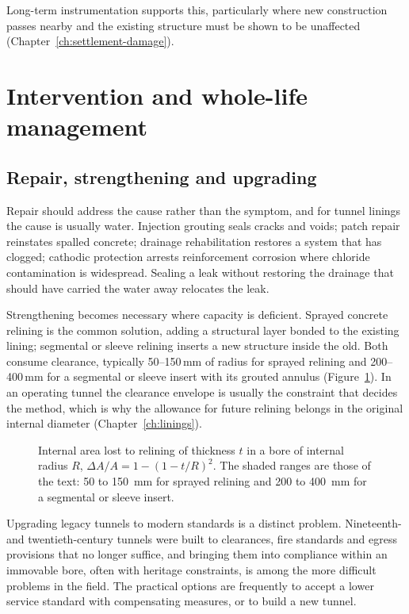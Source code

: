 Long-term instrumentation supports this, particularly where new construction
passes nearby and the existing structure must be shown to be unaffected
(Chapter~\ref{ch:settlement-damage}).

\section{Intervention and whole-life management}
\label{sec:intervention-whole-life}

\subsection{Repair, strengthening and upgrading}
\label{sec:repair-strengthening}

Repair should address the cause rather than the symptom, and for tunnel
linings the cause is usually water. Injection grouting seals cracks and voids;
patch repair reinstates spalled concrete; drainage rehabilitation restores a
system that has clogged; cathodic protection arrests reinforcement corrosion
where chloride contamination is widespread. Sealing a leak without restoring
the drainage that should have carried the water away relocates the leak.

Strengthening becomes necessary where capacity is deficient. Sprayed
concrete relining is the common solution, adding a structural layer bonded to
the existing lining; segmental or sleeve relining inserts a new structure
inside the old. Both consume clearance, typically 50--150\,mm of radius for
sprayed relining and 200--400\,mm for a segmental or sleeve insert with its
grouted annulus (Figure~\ref{fig:relining-clearance}). In an operating tunnel the
clearance envelope is usually the constraint that decides the method, which
is why the allowance for future relining belongs in the original internal
diameter (Chapter~\ref{ch:linings}).

\begin{figure}[htbp]
\centering
{}
\caption{Internal area lost to relining of thickness $t$ in a bore of internal radius $R$, $\Delta A/A = 1 - (1 - t/R)^2$. The shaded ranges are those of the text: 50 to 150~mm for sprayed relining and 200 to 400~mm for a segmental or sleeve insert.}
\label{fig:relining-clearance}
\end{figure}

Upgrading legacy tunnels to modern standards is a distinct problem.
Nineteenth- and twentieth-century tunnels were built to clearances, fire standards and
egress provisions that no longer suffice, and bringing them into compliance
within an immovable bore, often with heritage constraints, is among the more
difficult problems in the field. The practical options are frequently to accept a
lower service standard with compensating measures, or to build a new tunnel.

